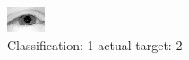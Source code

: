 \begin{figure}[h!]
\begin{center}
\includegraphics[width=0.60\columnwidth]{figures/ID2250_class_1_target_2.png}
\end{center}
\caption{ Classification: 1 actual target: 2}
\label{fig:ID2250_class_1_target_2}
\end{figure}
